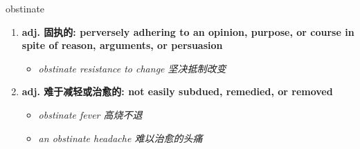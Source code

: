 
\begin{frame}
{\huge obstinate}
\begin{center}
\begin{enumerate}\Large
  \item \textbf{adj. 固执的: perversely adhering to an opinion, purpose, or course in spite of reason, arguments, or persuasion}
  \begin{itemize}
    \item \em{\Large{obstinate resistance to change 坚决抵制改变}}
  \end{itemize}
  \item \textbf{adj. 难于减轻或治愈的: not easily subdued, remedied, or removed}
  \begin{itemize}
    \item \em{\Large{obstinate fever 高烧不退}}
    \item \em{\Large{an obstinate headache 难以治愈的头痛}}
  \end{itemize}
\end{enumerate}
\end{center}
\end{frame}
